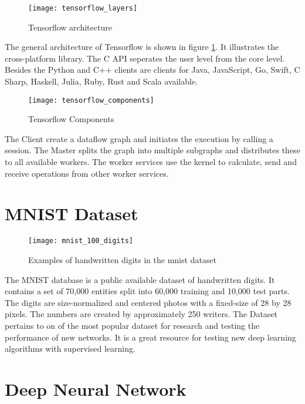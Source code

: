 \begin{figure}[H]
    \centering
    \texttt{[image: tensorflow\_layers]}
    \caption{\cite{tensorflow_layers_image} Tensorflow architecture}
    \label{fig:tensorflow_layers}
\end{figure}
The general architecture of Tensorflow is shown in figure \ref{fig:tensorflow_layers}.
It illustrates the cross-platform library.
The C API seperates the user level from the core level.
Besides the Python and C++ clients are clients for Java, JavaScript, Go, Swift, C Sharp, Haskell, Julia, Ruby, Rust and Scala available.
\cite{tensorflow-architecture}

\begin{figure}[H]
    \centering
    \texttt{[image: tensorflow\_components]}
    \caption{\cite{tensorflow_components_image} Tensorflow Components}
    \label{fig:tensorflow_components}
\end{figure}

The Client create a dataflow graph and initiates the execution by calling a session.
The Master splits the graph into multiple subgraphs and distributes these to all available workers.
The worker services use the kernel to calculate, send and receive operations from other worker services.
\cite{tensorflow-architecture}

\section{MNIST Dataset}

\begin{figure}[H]
    \centering
    \texttt{[image: mnist\_100\_digits]}
    \caption{\cite{mnist_examples_image} Examples of handwritten digits in the mnist dataset}
    \label{fig:mnist_examples}
\end{figure}

The MNIST database is a public available dataset of handwritten digits.
It contains a set of 70,000 entities split into 60,000 training and 10,000 test parts.
The digits are size-normalized and centered photos with a fixed-size of 28 by 28 pixels.
The numbers are created by approximately 250 writers. 
\cite{mnist-database}
The Dataset pertains to on of the most popular dataset for research and testing the performance of new networks.
It is a great resource for testing new deep learning algorithms with supervised learning.

\section{Deep Neural Network}

